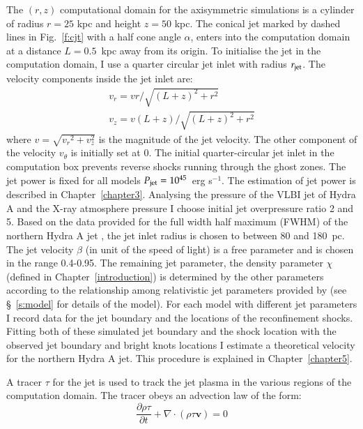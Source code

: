 The $(r, z)$ computational domain for the axisymmetric simulations is a cylinder of radius $r=25$ kpc and height $z=50$ kpc. The conical jet marked by dashed lines in Fig.~\ref{f:cjt} with a half cone angle $\alpha$, enters into the computation domain at a distance $L=0.5$~kpc away from its origin. To initialise the jet in the computation domain, I use a quarter circular jet inlet with radius $r_{\rm jet}$. The velocity components inside the jet inlet are:
\begin{eqnarray}
v_r = vr/\sqrt{(L+z)^2+r^2} \\
v_z = v(L+z)/\sqrt{(L+z)^2+r^2}
\end{eqnarray} 
where $v=\sqrt{{v_r}^2+v_z^2}$ is the magnitude of the jet velocity. The other component of the velocity $v_\theta$ is initially set at 0. The initial quarter-circular jet inlet in the computation box prevents reverse shocks running through the ghost zones. 
The jet power is fixed for all models $P_{\rm jet} = 10^{45} $~erg s$^{-1}$. The estimation of jet power is described in Chapter~\ref{chapter3}. Analysing the pressure of the VLBI jet of Hydra A \citep{taylor96} and the X-ray atmosphere pressure \citep{david01} I choose initial jet overpressure ratio 2 and 5. Based on the data provided for the full width half maximum (FWHM) of the northern Hydra A jet \citep{taylor90}, the jet inlet radius is chosen to between 80 and 180~pc. The jet velocity $\beta$ (in unit of the speed of light) is a free parameter and is chosen in the range 0.4-0.95. The remaining jet parameter, the density parameter $\chi$ (defined in Chapter~\ref{introduction}) is determined by the other parameters according to the relationship among relativistic jet parameters provided by \citep{sutherland07} (see \S~\ref{s:model} for details of the model). For each model with different jet parameters I record data for the jet boundary and the locations of the reconfinement shocks. Fitting both of these simulated jet boundary and the shock location with the observed jet boundary and bright knots locations I estimate a theoretical velocity for the northern Hydra A jet. This procedure is explained in Chapter~\ref{chapter5}.

A tracer $\tau$ for the jet is used to track the jet plasma in the various regions of the computation domain. The tracer obeys an advection law of the form: 
\begin{equation}
\frac{\partial \rho \tau}{\partial t}+ \nabla \cdot (\rho \tau \textbf{v}) = 0
\end{equation}

